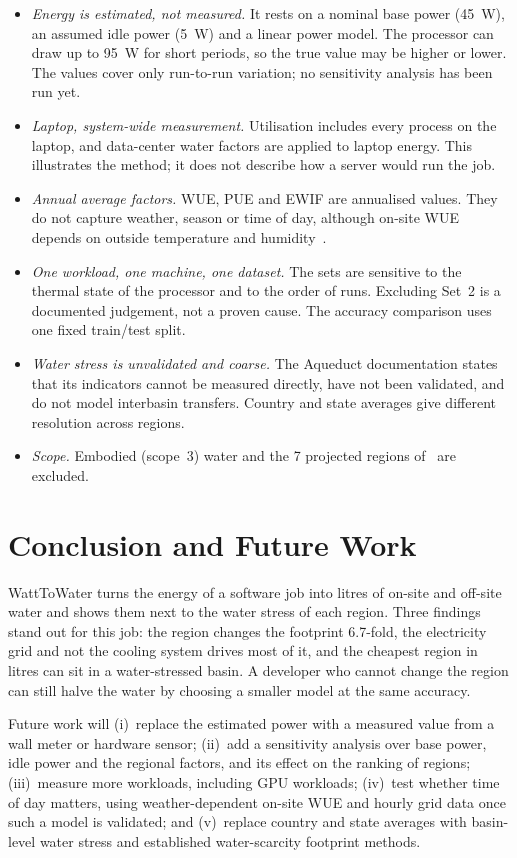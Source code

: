 \documentclass[conference]{IEEEtran}
\begin{document}
\begin{itemize}
\item \textit{Energy is estimated, not measured.} It rests on a nominal base power (45~W), an assumed idle power (5~W) and a linear power model. The processor can draw up to 95~W for short periods, so the true value may be higher or lower. The \pm{} values cover only run-to-run variation; no sensitivity analysis has been run yet.
\item \textit{Laptop, system-wide measurement.} Utilisation includes every process on the laptop, and data-center water factors are applied to laptop energy. This illustrates the method; it does not describe how a server would run the job.
\item \textit{Annual average factors.} WUE, PUE and EWIF are annualised values. They do not capture weather, season or time of day, although on-site WUE depends on outside temperature and humidity~\cite{li2023thirsty}.
\item \textit{One workload, one machine, one dataset.} The sets are sensitive to the thermal state of the processor and to the order of runs. Excluding Set~2 is a documented judgement, not a proven cause. The accuracy comparison uses one fixed train/test split.
\item \textit{Water stress is unvalidated and coarse.} The Aqueduct documentation states that its indicators cannot be measured directly, have not been validated, and do not model interbasin transfers. Country and state averages give different resolution across regions.
\item \textit{Scope.} Embodied (scope~3) water and the 7 projected regions of~\cite{li2023thirsty} are excluded.
\end{itemize}

\section{Conclusion and Future Work}

WattToWater turns the energy of a software job into litres of on-site and off-site water and shows them next to the water stress of each region. Three findings stand out for this job: the region changes the footprint 6.7-fold, the electricity grid and not the cooling system drives most of it, and the cheapest region in litres can sit in a water-stressed basin. A developer who cannot change the region can still halve the water by choosing a smaller model at the same accuracy.

Future work will (i)~replace the estimated power with a measured value from a wall meter or hardware sensor; (ii)~add a sensitivity analysis over base power, idle power and the regional factors, and its effect on the ranking of regions; (iii)~measure more workloads, including GPU workloads; (iv)~test whether time of day matters, using weather-dependent on-site WUE and hourly grid data once such a model is validated; and (v)~replace country and state averages with basin-level water stress and established water-scarcity footprint methods.
\end{document}
